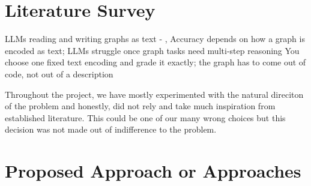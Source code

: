 \documentclass[twoside,english]{article}
\begin{document}
\section{Literature Survey} \label{sec:litsurvey}
LLMs reading and writing graphs as text - \citep{fatemi2024talklikegraph}, 
Accuracy depends on how a graph is encoded as text; LLMs struggle once graph tasks need multi-step reasoning
You choose one fixed text encoding and grade it exactly; the graph has to come out of code, not out of a description

Throughout the project, we have mostly experimented with the natural direciton of the problem and honestly, did 
not rely and take much inspiration from established literature. This could be one of our many wrong choices but 
this decision was not made out of indifference to the problem.

\section{Proposed Approach or Approaches} \label{sec:our_proj}
\end{document}
